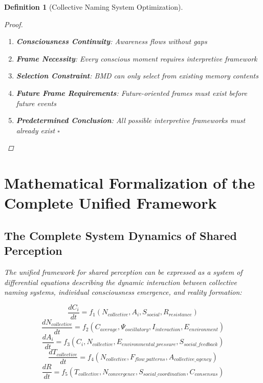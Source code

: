 \documentclass[12pt]{article}
\newtheorem{definition}{Definition}
\begin{document}
\begin{definition}[Collective Naming System Optimization]
\begin{proof}
\begin{enumerate}
\item \textbf{Consciousness Continuity}: Awareness flows without gaps
\item \textbf{Frame Necessity}: Every conscious moment requires interpretive framework
\item \textbf{Selection Constraint}: BMD can only select from existing memory contents
\item \textbf{Future Frame Requirements}: Future-oriented frames must exist before future events
\item \textbf{Predetermined Conclusion}: All possible interpretive frameworks must already exist $\square$
\end{enumerate}
\end{proof}

\section{Mathematical Formalization of the Complete Unified Framework}

\subsection{The Complete System Dynamics of Shared Perception}

The unified framework for shared perception can be expressed as a system of differential equations describing the dynamic interaction between collective naming systems, individual consciousness emergence, and reality formation:

$$\frac{dC_i}{dt} = f_1(N_{collective}, A_i, S_{social}, R_{resistance})$$
$$\frac{dN_{collective}}{dt} = f_2(C_{average}, \Psi_{oscillatory}, I_{interaction}, E_{environment})$$
$$\frac{dA_i}{dt} = f_3(C_i, N_{collective}, E_{environmental\_pressure}, S_{social\_feedback})$$
$$\frac{dT_{collective}}{dt} = f_4(N_{collective}, F_{flow\_patterns}, A_{collective\_agency})$$
$$\frac{dR}{dt} = f_5(T_{collective}, N_{convergence}, S_{social\_coordination}, C_{consensus})$$


\end{definition}
\end{document}
